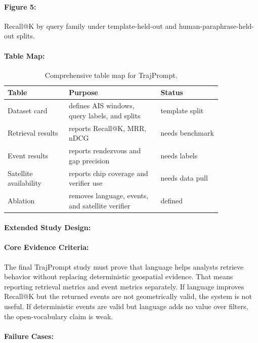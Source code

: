 \documentclass{article}
\begin{document}
\paragraph{Figure 5:}
Recall@K by query family under template-held-out and human-paraphrase-held-out splits.

\paragraph{Table Map:}

\begin{table}[t]
\centering
\caption{Comprehensive table map for TrajPrompt.}
\begin{tabular}{@{}p{0.24\linewidth}p{0.36\linewidth}p{0.24\linewidth}@{}}
\toprule
\textbf{Table} & \textbf{Purpose} & \textbf{Status}\\
\midrule
Dataset card & defines AIS windows, query labels, and splits & template split\\
Retrieval results & reports Recall@K, MRR, nDCG & needs benchmark\\
Event results & reports rendezvous and gap precision & needs labels\\
Satellite availability & reports chip coverage and verifier use & needs data pull\\
Ablation & removes language, events, and satellite verifier & defined\\
\bottomrule
\end{tabular}
\end{table}

\paragraph{Extended Study Design:}

\paragraph{Core Evidence Criteria:}

The final TrajPrompt study must prove that language helps analysts retrieve behavior without replacing deterministic geospatial evidence. That means reporting retrieval metrics and event metrics separately. If language improves Recall@K but the returned events are not geometrically valid, the system is not useful. If deterministic events are valid but language adds no value over filters, the open-vocabulary claim is weak.

\paragraph{Failure Cases:}
\end{document}
